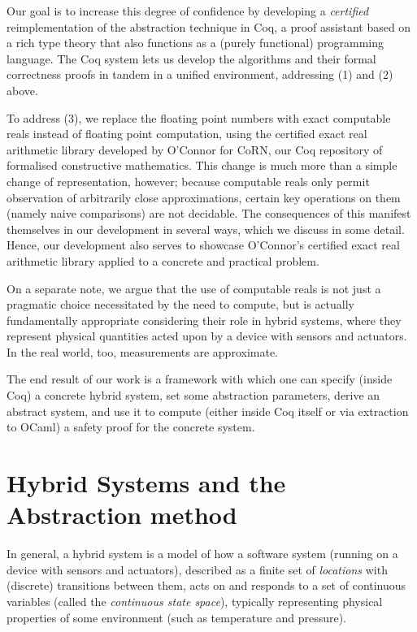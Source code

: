 \documentclass[runningheads]{llncs}
\begin{document}
Our goal is to increase this degree of confidence by developing a \emph{certified} reimplementation of the abstraction technique in Coq, a proof assistant based on a rich type theory that also functions as a (purely functional) programming language. The Coq system lets us develop the algorithms and their formal correctness proofs in tandem in a unified environment, addressing (1) and (2) above.

To address (3), we replace the floating point numbers with exact computable reals instead of floating point computation, using the certified exact real arithmetic library developed by O'Connor \cite{oconnor} for CoRN, our Coq repository of formalised constructive mathematics. \cite{corn} This change is much more than a simple change of representation, however; because computable reals only permit observation of arbitrarily close approximations, certain key operations on them (namely naive comparisons) are not decidable. The consequences of this manifest themselves in our development in several ways, which we discuss in some detail. Hence, our development also serves to showcase O'Connor's certified exact real arithmetic library applied to a concrete and practical problem.

On a separate note, we argue that the use of computable reals is not just a pragmatic choice necessitated by the need to compute, but is actually fundamentally appropriate considering their role in hybrid systems, where they represent physical quantities acted upon by a device with sensors and actuators. In the real world, too, measurements are approximate.

The end result of our work is a framework with which one can specify (inside Coq) a concrete hybrid system, set some abstraction parameters, derive an abstract system, and use it to compute (either inside Coq itself or via extraction to OCaml) a safety proof for the concrete system.

\section{Hybrid Systems and the Abstraction method}
\label{sec:hybsys}
In general, a hybrid system is a model of how a software system (running on a device with sensors and actuators), described as a finite set of \emph{locations}
with (discrete) transitions between them, acts
on and responds to a set of continuous variables (called the
\emph{continuous state space}), typically representing physical
properties of some environment (such as temperature and pressure).
\end{document}
